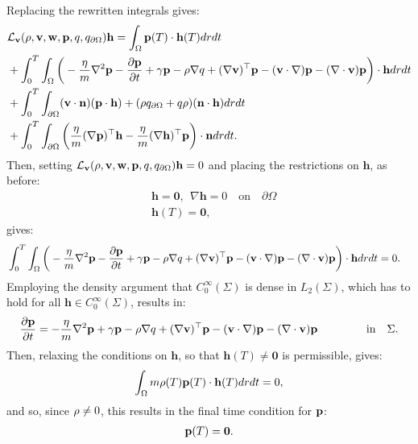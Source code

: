 Replacing the rewritten integrals gives:
\begin{align*}
&\mathcal{L}_{\mathbf{v}}(\rho,\mathbf{v},\mathbf{w},\mathbf{p},q,{q}_{\partial \Omega}) \mathbf{h} = \int_\Omega\mathbf{p}(T) \cdot \mathbf{h}(T) dr dt\\
&+\int_0^T \int_\Omega 
\bigg( - \frac{\eta}{m} \nabla^2 \mathbf{p} -   \frac{\partial \mathbf{p}}{\partial t} + \gamma\mathbf{p}-\rho\nabla q +(\nabla \mathbf{v})^\top\mathbf{p} 
- (\mathbf{v} \cdot \nabla)\mathbf{p} -  (\nabla \cdot \mathbf{v})\mathbf{p}   \bigg)\cdot  \mathbf{h} drdt\\
& +\int_0^T \int_{\partial\Omega} (\mathbf{v} \cdot \mathbf{n})(\mathbf{p} \cdot \mathbf{h}) +(\rho  {q}_{\partial \Omega} + q \rho)  (\mathbf{n}\cdot \mathbf{h}) dr dt \\
&+ \int_0^T \int_{\partial \Omega}  \bigg( \frac{\eta}{m}  (\nabla \mathbf{p})^\top \mathbf{h}  - \frac{\eta}{m}(\nabla \mathbf{h})^\top \mathbf{p} \bigg) \cdot \mathbf{n} dr dt.
\end{align*}
Then, setting $\mathcal{L}_{\mathbf{v}}(\rho,\mathbf{v},\mathbf{w},\mathbf{p},q,{q}_{\partial \Omega}) \mathbf{h}={0}$ and placing the restrictions on $\mathbf{h}$, as before:
\begin{align*}
&\mathbf{h}=\mathbf{0}, \ \ \nabla \mathbf{h} = 0 \quad \text{on} \quad \partial \Omega\\
&\mathbf{h}(T)=\mathbf{0},
\end{align*}
gives:
\begin{align*}
&\int_0^T \int_\Omega 
\bigg( - \frac{\eta}{m} \nabla^2 \mathbf{p} -   \frac{\partial \mathbf{p}}{\partial t} + \gamma\mathbf{p}-\rho\nabla q +(\nabla \mathbf{v})^\top\mathbf{p} 
- (\mathbf{v} \cdot \nabla)\mathbf{p} -  (\nabla \cdot \mathbf{v})\mathbf{p}    \bigg)\cdot  \mathbf{h} drdt = 0.
\end{align*}
Employing the density argument that $C_0^\infty(\Sigma)$ is dense in $L_2(\Sigma)$, which has to hold for all $\mathbf{h}\in C_0^\infty(\Sigma)$, results in:
\begin{align*}
   \frac{\partial \Adja}{\partial t} =  - \frac{\eta}{m} \nabla^2 \Adja  + \gamma\Adja-\Sta\nabla \Adjb +(\nabla \Stav)^\top\Adja 
- (\Stav \cdot \nabla)\Adja -  (\nabla \cdot \Stav)\Adja     \ \qquad\qquad \text{in} \quad \Sigma.
\end{align*}
Then, relaxing the conditions on $\mathbf{h}$, so that $\mathbf{h}(T) \neq \mathbf{0} $ is permissible, gives:
\begin{align*}
 \int_\Omega m \rho(T) \mathbf{p}(T) \cdot \mathbf{h}(T) dr dt=0,
\end{align*}
and so, since $\rho \neq 0$, this results in the final time condition for $\mathbf{p}$:
\begin{align}
\mathbf{p}(T)=\mathbf{0}.
\end{align}
